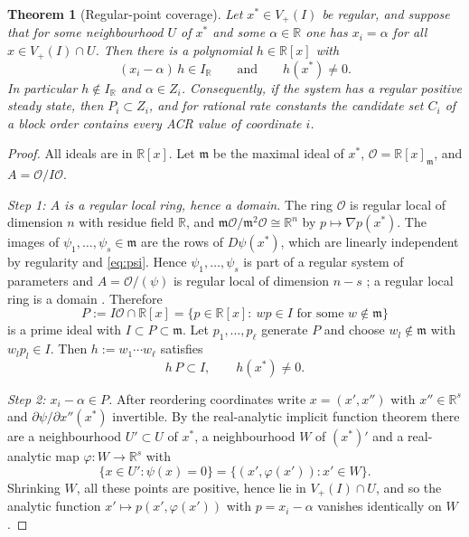 \documentclass[11pt,a4paper]{article}
\theoremstyle{plain}
\newtheorem{theorem}{Theorem}[section]
\theoremstyle{definition}
\theoremstyle{remark}
\newcommand{\R}{\mathbb{R}}
\begin{document}
\begin{theorem}[Regular-point coverage]\label{thm:regular}
Let $x^*\in V_+(I)$ be regular, and suppose that for some neighbourhood $U$ of $x^*$ and some $\alpha\in\R$ one has $x_i=\alpha$ for all $x\in V_+(I)\cap U$. Then there is a polynomial $h\in\R[x]$ with
\begin{equation}\label{eq:regularwitness}
  (x_i-\alpha)\,h\in I_\R\qquad\text{and}\qquad h(x^*)\neq0 .
\end{equation}
In particular $h\notin I_\R$ and $\alpha\in Z_i$. Consequently, if the system has a regular positive steady state, then $P_i\subset Z_i$, and for rational rate constants the candidate set $C_i$ of a block order contains every ACR value of coordinate $i$.
\end{theorem}
\begin{proof}
All ideals are in $\R[x]$. Let $\mathfrak m$ be the maximal ideal of $x^*$, $\mathcal O=\R[x]_{\mathfrak m}$, and $A=\mathcal O/I\mathcal O$.

\emph{Step 1: $A$ is a regular local ring, hence a domain.} The ring $\mathcal O$ is regular local of dimension $n$ with residue field $\R$, and $\mathfrak m\mathcal O/\mathfrak m^2\mathcal O\cong\R^n$ by $p\mapsto\nabla p(x^*)$. The images of $\psi_1,\dots,\psi_s\in\mathfrak m$ are the rows of $D\psi(x^*)$, which are linearly independent by regularity and \eqref{eq:psi}. Hence $\psi_1,\dots,\psi_s$ is part of a regular system of parameters and $A=\mathcal O/(\psi)$ is regular local of dimension $n-s$ \cite[Theorem~14.2]{matsumura}; a regular local ring is a domain \cite[Theorem~14.3]{matsumura}. Therefore
\[
  P:=I\mathcal O\cap\R[x]=\{p\in\R[x]:\ wp\in I\text{ for some }w\notin\mathfrak m\}
\]
is a prime ideal with $I\subset P\subset\mathfrak m$. Let $p_1,\dots,p_\ell$ generate $P$ and choose $w_l\notin\mathfrak m$ with $w_lp_l\in I$. Then $h:=w_1\cdots w_\ell$ satisfies
\begin{equation}\label{eq:hP}
  h\,P\subset I,\qquad h(x^*)\neq0 .
\end{equation}

\emph{Step 2: $x_i-\alpha\in P$.} After reordering coordinates write $x=(x',x'')$ with $x''\in\R^s$ and $\partial\psi/\partial x''(x^*)$ invertible. By the real-analytic implicit function theorem there are a neighbourhood $U'\subset U$ of $x^*$, a neighbourhood $W$ of $(x^*)'$ and a real-analytic map $\varphi\colon W\to\R^s$ with
\[
  \{x\in U':\psi(x)=0\}=\{(x',\varphi(x')):x'\in W\}.
\]
Shrinking $W$, all these points are positive, hence lie in $V_+(I)\cap U$, and so the analytic function $x'\mapsto p(x',\varphi(x'))$ with $p=x_i-\alpha$ vanishes identically on $W$.


\end{proof}
\end{document}

